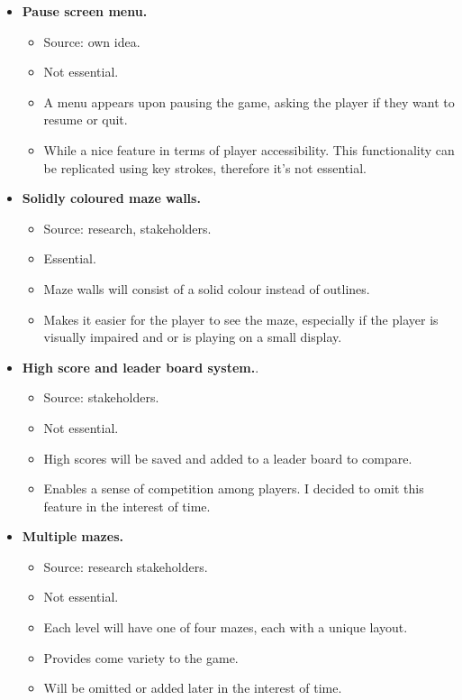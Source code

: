 \documentclass[letterpaper, 11pt]{article}
\begin{document}
\begin{itemize}
\item \textbf{Pause screen menu.}
\begin{itemize}
\item Source: own idea.
\item Not essential.
\item A menu appears upon pausing the game, asking the player if they want to resume or quit.
\item While a nice feature in terms of player accessibility.
This functionality can be replicated using key strokes, therefore it’s not essential.
\end{itemize}

\item \textbf{Solidly coloured maze walls.}
\begin{itemize}
\item Source: research, stakeholders.
\item Essential.
\item Maze walls will consist of a solid colour instead of outlines.
\item Makes it easier for the player to see the maze, especially if the player is visually impaired and or is playing on a small display.
\end{itemize}

\item \textbf{High score and leader board system.}.
\begin{itemize}
\item Source: stakeholders.
\item Not essential.
\item High scores will be saved and added to a leader board to compare.
\item Enables a sense of competition among players.
I decided to omit this feature in the interest of time.
\end{itemize}

\item \textbf{Multiple mazes.}
\begin{itemize}
\item Source: research stakeholders.
\item Not essential.
\item Each level will have one of four mazes, each with a unique layout.
\item Provides come variety to the game.
\item Will be omitted or added later in the interest of time.
\end{itemize}


\end{itemize}
\end{document}
